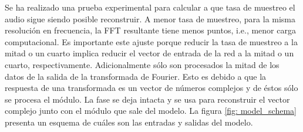 Se ha realizado una prueba experimental para calcular a que tasa de muestreo el audio sigue siendo posible reconstruir. A menor tasa de muestreo, para la misma resolución en frecuencia, la \gls{FFT} resultante tiene menos puntos, i.e., menor carga computacional. Es importante este ajuste porque reducir la tasa de muestreo a la mitad o un cuarto implica reducir el vector de entrada de la red a la mitad o un cuarto, respectivamente. Adicionalmente sólo son procesados la mitad de los datos de la salida de la transformada de Fourier. Esto es debido a que la respuesta de una transformada es un vector de números complejos y de éstos sólo se procesa el módulo. La fase se deja intacta y se usa para reconstruir el vector complejo junto con el módulo que sale del modelo. La figura \ref{fig: model_schema} presenta un esquema de cuáles son las entradas y salidas del modelo.

